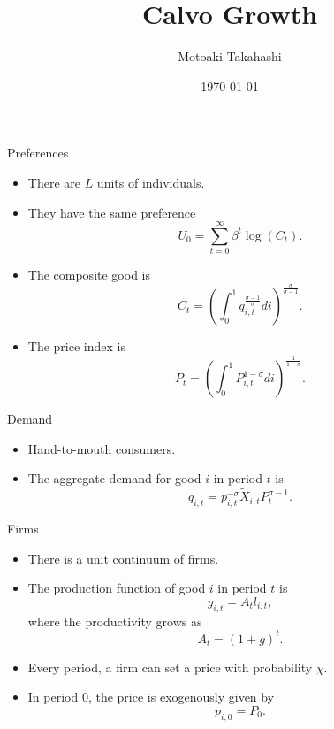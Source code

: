 \documentclass[9pt]{beamer}
\title{Calvo Growth}
\subtitle{}
\author{Motoaki Takahashi}
\institute{Penn State}
\date{\today}
\begin{document}
\titlepage

\begin{frame}{Preferences}
    \begin{itemize}
        \item There are $L$ units of individuals.
        \item They have the same preference
        \begin{equation}
            U_{0}=\sum_{t=0}^{\infty}\beta^{t}\log(C_{t}).
        \end{equation}
        \item The composite good is
        \begin{equation}
            C_{t}=\left(\int_{0}^{1}q_{i,t}^{\frac{\sigma-1}{\sigma}} di\right)^{\frac{\sigma}{\sigma-1}}.
        \end{equation}
        \item The price index is
        \begin{equation}
            P_{t}=\left(\int_{0}^{1}P_{i,t}^{1-\sigma}di \right)^{\frac{1}{1-\sigma}}.
        \end{equation}
    \end{itemize}
\end{frame}

\begin{frame}{Demand}
    \begin{itemize}
        \item Hand-to-mouth consumers.
        \item The aggregate demand for good $i$ in period $t$ is
        \begin{equation}
            q_{i,t}=p_{i,t}^{-\sigma}\tilde{X}_{i,t}P_{t}^{\sigma-1}.
        \end{equation}
    \end{itemize}
\end{frame}

\begin{frame}{Firms}
    \begin{itemize}
        \item There is a unit continuum of firms.
        \item The production function of good $i$ in period $t$ is
        \begin{equation}
            y_{i,t}=A_{t}l_{i,t},
        \end{equation}
        where the productivity grows as
        \begin{equation}
            A_{t}=(1+g)^{t}.
        \end{equation}
        \item Every period, a firm can set a price with probability $\chi$.
        \item In period $0$, the price is exogenously given by
        \begin{equation}
            p_{i,0}=P_{0}.
        \end{equation}
    \end{itemize}
\end{frame}
\end{document}
